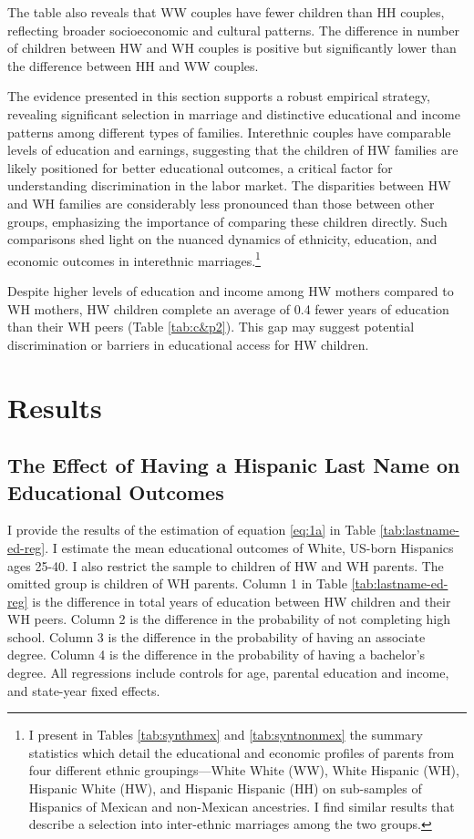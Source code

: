 The table also reveals that WW couples have fewer children than HH couples, reflecting broader socioeconomic and cultural patterns. The difference in number of children between HW and WH couples is positive but significantly lower than the difference between HH and WW couples.

The evidence presented in this section supports a robust empirical strategy, revealing significant selection in marriage and distinctive educational and income patterns among different types of families. Interethnic couples have comparable levels of education and earnings, suggesting that the children of HW families are likely positioned for better educational outcomes, a critical factor for understanding discrimination in the labor market. The disparities between HW and WH families are considerably less pronounced than those between other groups, emphasizing the importance of comparing these children directly. Such comparisons shed light on the nuanced dynamics of ethnicity, education, and economic outcomes in interethnic marriages.\footnote{I present in Tables \ref{tab:synthmex} and \ref{tab:syntnonmex} the summary statistics which detail the educational and economic profiles of parents from four different ethnic groupings—White White (WW), White Hispanic (WH), Hispanic White (HW), and Hispanic Hispanic (HH) on sub-samples of Hispanics of Mexican and non-Mexican ancestries. I find similar results that describe a selection into inter-ethnic marriages among the two groups.} 

Despite higher levels of education and income among HW mothers compared to WH mothers, HW children complete an average of 0.4 fewer years of education than their WH peers (Table \ref{tab:c&p2}). This gap may suggest potential discrimination or barriers in educational access for HW children.

\section{Results}\label{sec:results}

\subsection{The Effect of Having a Hispanic Last Name on Educational Outcomes}

I provide the results of the estimation of equation \ref{eq:1a} in Table \ref{tab:lastname-ed-reg}. I estimate the mean educational outcomes of White, US-born Hispanics ages 25-40. I also restrict the sample to children of HW and WH parents. The omitted group is children of WH parents. Column 1 in Table \ref{tab:lastname-ed-reg} is the difference in total years of education between HW children and their WH peers. Column 2 is the difference in the probability of not completing high school. Column 3 is the difference in the probability of having an associate degree. Column 4 is the difference in the probability of having a bachelor’s degree. All regressions include controls for age, parental education and income, and state-year fixed effects.

